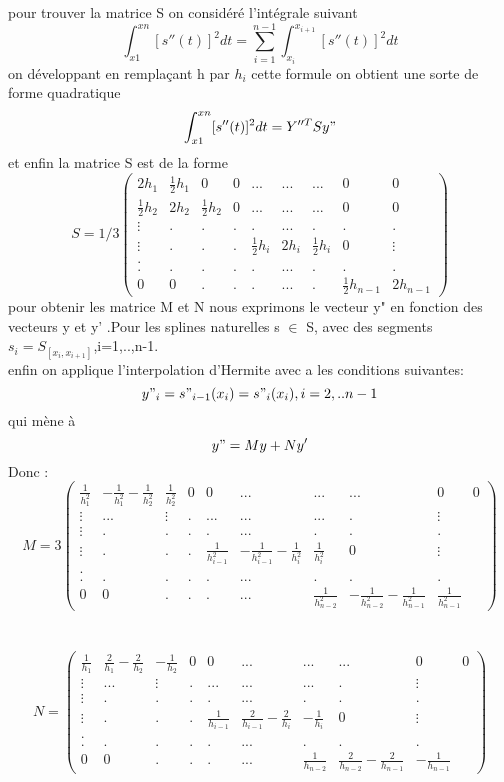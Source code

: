 \documentclass[a4paper,12pt]{article} %
\begin{document}
                
                pour trouver la matrice S on considéré  l'intégrale suivant \\
                $$\int_{x1}^{xn}[s''(t)]^2dt=\sum_{i=1}^{n-1}\int_{x_i}^{x_{i+1}}[s''(t)]^2dt$$
                on développant en remplaçant h par $h_i$   cette formule on obtient une sorte de forme quadratique  $$\int_{x1}^{xn}[s''(t)]^2dt= Y''^T S y"$$
                et enfin la matrice S est de la forme 
                $$S=1/3\begin{pmatrix} 2h_1&\frac{1}{2}h_1&0&0&...&...&...&0&0 \\ \frac{1}{2}h_2&2h_2&\frac{1}{2}h_2&0&...&...&...&0&0 \\ \vdots&.&.&.&.&...&.&.&.\\ \vdots&.&.&.&\frac{1}{2}h_i&2h_i&\frac{1}{2}h_i&0&\vdots \\. \\.&.&.&.&.&...&.&.&. \\ 0&0&.&.&.&...&.&\frac{1}{2}h_{n-1}&2h_{n-1} \end{pmatrix}$$
                pour obtenir les matrice M et N nous exprimons le vecteur y" en fonction des  vecteurs y et y' .Pour les splines naturelles s $\in$ S, avec des segments $s_i=S_{[x_i,x_{i+1}]}$,i=1,..,n-1.\\
                enfin on applique l'interpolation d'Hermite avec a les conditions suivantes:$$y"_i=s"_{i-1}(x_i)=s"_i(x_i) ,i=2,..n-1$$
                qui mène à $$y"=My+Ny'$$ Donc :
                $$M=3\begin{pmatrix} \frac{1}{h_1^2}&-\frac{1}{h_1^2}-\frac{1}{h_2^2}&\frac{1}{h_2^2}&0&0&...&...&...&0&0 \\ \vdots&...&\vdots&.&...&...&...&.&\vdots \\ \vdots&.&.&.&.&...&.&.&.\\ \vdots&.&.&.&\frac{1}{h_{i-1}^2}&-\frac{1}{h_{i-1}^2}-\frac{1}{h_i^2}&\frac{1}{h_i^2}&0&\vdots \\. \\.&.&.&.&.&...&.&.&. \\ 0&0&.&.&.&...&\frac{1}{h_{n-2}^2}&-\frac{1}{h_{n-2}^2}-\frac{1}{h_{n-1}^2}&\frac{1}{h_{n-1}^2} \end{pmatrix}$$
                \\
                \\$$N=\begin{pmatrix} \frac{1}{h_1}&\frac{2}{h_1}-\frac{2}{h_2}&-\frac{1}{h_2}&0&0&...&...&...&0&0 \\ \vdots&...&\vdots&.&...&...&...&.&\vdots \\ \vdots&.&.&.&.&...&.&.&.\\ \vdots&.&.&.&\frac{1}{h_{i-1}}&\frac{2}{h_{i-1}}-\frac{2}{h_i}&-\frac{1}{h_i}&0&\vdots \\. \\.&.&.&.&.&...&.&.&. \\ 0&0&.&.&.&...&\frac{1}{h_{n-2}}&\frac{2}{h_{n-2}}-\frac{2}{h_{n-1}}&-\frac{1}{h_{n-1}} \end{pmatrix}$$\\
\end{document}
